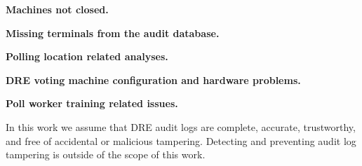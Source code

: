 \textbf{Machines not closed.} %

\textbf{Missing terminals from the audit database.} %

\textbf{Polling location related analyses.} %

\textbf{DRE voting machine configuration and hardware problems.} %

\textbf{Poll worker training related issues.} %

In this work we assume that DRE audit logs are complete, accurate,  trustworthy, and free of accidental or malicious tampering. Detecting and preventing audit log tampering is outside of the scope of this work.




